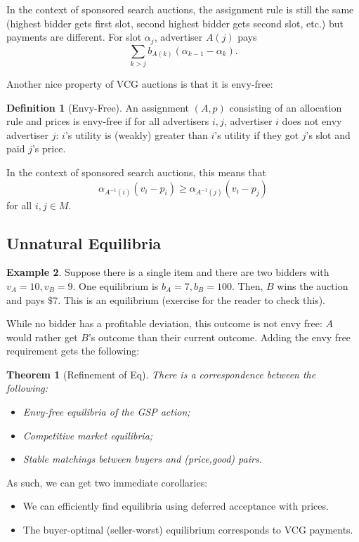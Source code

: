 \documentclass[dvipsnames]{article}
\newtheorem{theorem}{Theorem}[section]
\theoremstyle{definition}
\newtheorem{definition}{Definition}[section]
\newtheorem{example}[definition]{Example}
\theoremstyle{remark}
\begin{document}
In the context of sponsored search auctions, the assignment rule is still the same (highest bidder gets first slot, second highest bidder gets second slot, etc.) but payments are different. For slot $\alpha_j$, advertiser $A(j)$ pays
$$\sum_{k > j} b_{A(k)}(\alpha_{k-1}-\alpha_k).$$

Another nice property of VCG auctions is that it is envy-free:

\begin{definition}[Envy-Free]
	An assignment $(A,p)$ consisting of an allocation rule and prices is envy-free if for all advertisers $i,j$, advertiser $i$ does not envy advertiser $j$: $i$'s utility is (weakly) greater than $i$'s utility if they got $j$'s slot and paid $j$'s price.
\end{definition}

In the context of sponsored search auctions, this means that 
$$\alpha_{A^{-1}(i)}(v_i-p_i) \geq \alpha_{A^{-1}(j)}(v_i-p_j)$$
for all $i,j \in M$.

\subsection{Unnatural Equilibria}
\begin{example}
	Suppose there is a single item and there are two bidders with $v_A = 10, v_B = 9$. One equilibrium is $b_A = 7, b_B = 100$. Then, $B$ wins the auction and pays $\$7$. This is an equilibrium (exercise for the reader to check this).
\end{example}
While no bidder has a profitable deviation, this outcome is not envy free: $A$ would rather get $B$'s outcome than their current outcome. Adding the envy free requirement gets the following:

\begin{theorem}[Refinement of Eq]
	There is a correspondence between the following:
	\begin{itemize}
		\item Envy-free equilibria of the GSP action;
		\item Competitive market equilibria;
		\item Stable matchings between buyers and (price,good) pairs.
	\end{itemize}
\end{theorem}

As such, we can get two immediate corollaries: 
\begin{itemize}
	\item We can efficiently find equilibria using deferred acceptance with prices.
	\item The buyer-optimal (seller-worst) equilibrium corresponds to VCG payments.
\end{itemize}
\end{document}

